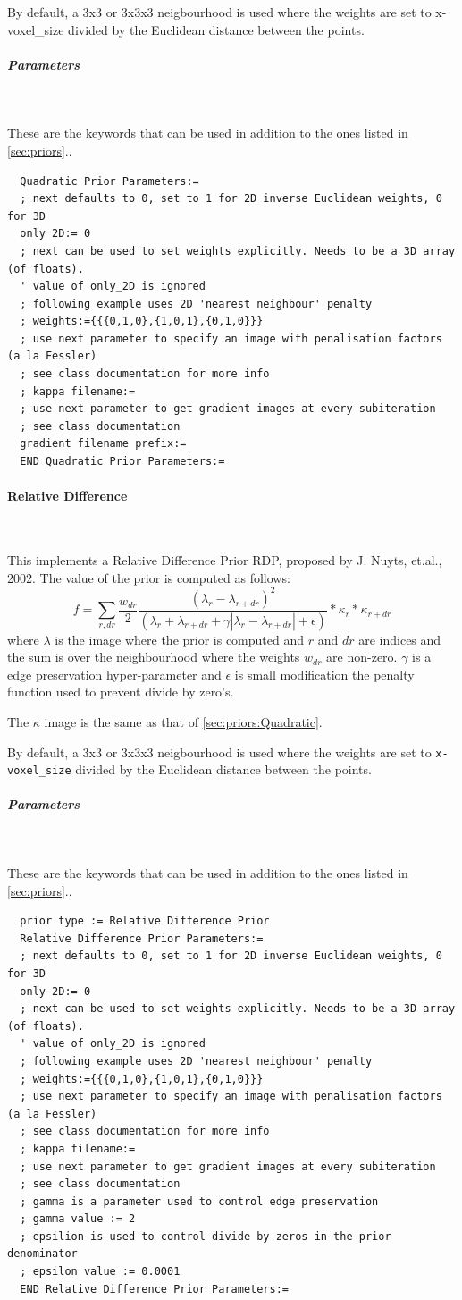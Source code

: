\documentclass{article}
\newcommand{\subsubsubsection}[1]{\paragraph{#1}\mbox{} \\}
\newcommand{\subsubsubsubsection}[1]{\subparagraph{#1} \mbox{} \\}
\begin{document}
{{  By default, a 3x3 or 3x3x3 neigbourhood is used where the weights are set to 
  x-voxel\_size divided by the Euclidean distance between the points.
 
{ \subsubsubsubsection{Parameters}
}
  These are the keywords that can be used in addition to the ones listed in \ref{sec:priors}..
  \begin{verbatim}
  Quadratic Prior Parameters:=
  ; next defaults to 0, set to 1 for 2D inverse Euclidean weights, 0 for 3D 
  only 2D:= 0
  ; next can be used to set weights explicitly. Needs to be a 3D array (of floats).
  ' value of only_2D is ignored
  ; following example uses 2D 'nearest neighbour' penalty
  ; weights:={{{0,1,0},{1,0,1},{0,1,0}}}
  ; use next parameter to specify an image with penalisation factors (a la Fessler)
  ; see class documentation for more info
  ; kappa filename:=
  ; use next parameter to get gradient images at every subiteration
  ; see class documentation
  gradient filename prefix:= 
  END Quadratic Prior Parameters:=
  \end{verbatim}


{ \subsubsubsection{Relative Difference} \label{sec:priors:Relative_Difference}
}
This implements a Relative Difference Prior RDP, proposed by J. Nuyts, et.al., 2002. The value of the prior is computed as follows:
  \[
      f= \sum_{r,dr} \frac{w_{dr}}{2} \frac{(\lambda_r - \lambda_{r+dr})^2}{(\lambda_r+ \lambda_{r+dr} + \gamma |\lambda_r - \lambda_{r+dr}| + \epsilon)} * \kappa_r * \kappa_{r+dr}
  \]
  \noindent where $\lambda$ is the image where the prior is computed
   and $r$ and $dr$ are indices and the sum
  is over the neighbourhood where the weights $w_{dr}$ are non-zero.
  $\gamma$ is a edge preservation hyper-parameter and $\epsilon$ is small 
  modification the penalty function used to prevent divide by zero's.

  The $\kappa$ image is the same as that of \ref{sec:priors:Quadratic}.

  By default, a 3x3 or 3x3x3 neigbourhood is used where the weights are set to 
  \texttt{x-voxel\_size} divided by the Euclidean distance between the points.
 
{ \subsubsubsubsection{Parameters}
}
  These are the keywords that can be used in addition to the ones listed in \ref{sec:priors}..
  \begin{verbatim}
  prior type := Relative Difference Prior
  Relative Difference Prior Parameters:=
  ; next defaults to 0, set to 1 for 2D inverse Euclidean weights, 0 for 3D 
  only 2D:= 0
  ; next can be used to set weights explicitly. Needs to be a 3D array (of floats).
  ' value of only_2D is ignored
  ; following example uses 2D 'nearest neighbour' penalty
  ; weights:={{{0,1,0},{1,0,1},{0,1,0}}}
  ; use next parameter to specify an image with penalisation factors (a la Fessler)
  ; see class documentation for more info
  ; kappa filename:=
  ; use next parameter to get gradient images at every subiteration
  ; see class documentation
  ; gamma is a parameter used to control edge preservation
  ; gamma value := 2
  ; epsilion is used to control divide by zeros in the prior denominator
  ; epsilon value := 0.0001
  END Relative Difference Prior Parameters:=
  \end{verbatim}

}}
\end{document}
